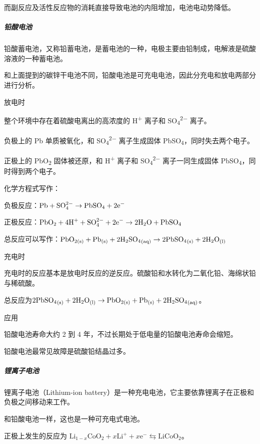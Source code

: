 \documentclass[
]{article}
\begin{document}
而副反应及活性反应物的消耗直接导致电池的内阻增加，电池电动势降低。

\hypertarget{header-n35}{%
\subparagraph{铅酸电池}\label{header-n35}}

铅酸蓄电池，又称铅蓄电池，是蓄电池的一种，电极主要由铅制成，电解液是硫酸溶液的一种蓄电池。

和上面提到的碳锌干电池不同，铅酸电池是可充电电池，因此分充电和放电两部分进行分析。

放电时

整个环境中存在着硫酸电离出的高浓度的 H\textsuperscript{+} 离子和
SO\textsubscript{4}\textsuperscript{2−} 离子。

负极上的 Pb 单质被氧化，和 SO\textsubscript{4}\textsuperscript{2−}
离子生成固体 PbSO\textsubscript{4}，同时失去两个电子。

正极上的 PbO\textsubscript{2} 固体被还原，和 H\textsuperscript{+} 离子和
SO\textsubscript{4}\textsuperscript{2−} 离子一同生成固体
PbSO\textsubscript{4}，同时得到两个电子。

化学方程式写作：

负极反应：\({\displaystyle {\rm {Pb+SO_{4}^{2-}\rightarrow PbSO_{4}+2e^{-}}}}\)

正极反应：\({\displaystyle {\rm {PbO_{2}+4H^{+}+SO_{4}^{2-}+2e^{-}\rightarrow 2H_{2}O+PbSO_{4}}}}\)

总反应可以写作：\({\rm {PbO_{{2(s)}}+Pb_{{(s)}}+2{H_{2}SO_{4}}_{{(aq)}}\rightarrow 2{PbSO_{4}}_{{(s)}}+2{H_{2}O}_{{(l)}}}}\)

充电时

充电时的反应基本是放电时反应的逆反应。硫酸铅和水转化为二氧化铅、海绵状铅与稀硫酸。

总反应为\({\rm {2{PbSO_{4}}_{{(s)}}+2{H_{2}O}_{{(l)}}\rightarrow PbO_{{2(s)}}+Pb_{{(s)}}+2{H_{2}SO_{4}}_{{(aq)}}}}\)。

应用

铅酸电池寿命大约 2 到 4 年，不过长期处于低电量的铅酸电池寿命会缩短。

铅酸电池最常见故障是硫酸铅结晶过多。

\hypertarget{header-n96}{%
\subparagraph{锂离子电池}\label{header-n96}}

锂离子电池（Lithium-ion
battery）是一种充电电池，它主要依靠锂离子在正极和负极之间移动来工作。

和铅酸电池一样，这也是一种可充电式电池。

正极上发生的反应为
\({\displaystyle \mathrm {Li} _{1-x}\mathrm {CoO_{2}} +x\mathrm {Li^{+}} +x\mathrm {e^{-}} \leftrightarrows \mathrm {LiCoO_{2}} }\)。
\end{document}
